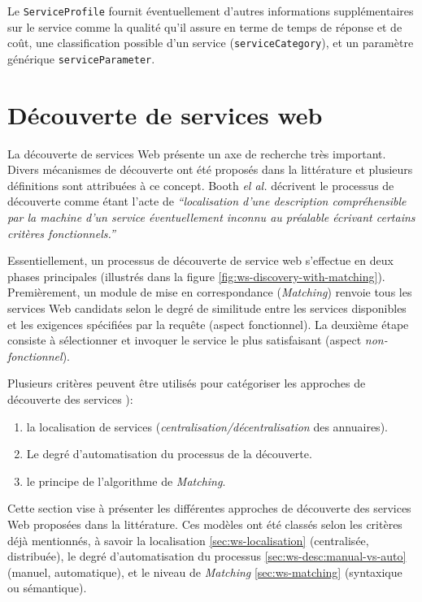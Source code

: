     Le \verb|ServiceProfile| fournit éventuellement d'autres
    informations supplémentaires sur le service comme la qualité qu'il
    assure en terme de temps de réponse et de coût, une classification
    possible d'un service (\verb|serviceCategory|), et un paramètre
    générique \verb|serviceParameter|.

\newpage
\section{Découverte de services web}
\label{sec:ws-discovery}
La découverte de services Web présente un axe de recherche très
important. Divers mécanismes de découverte ont été proposés dans la
littérature et plusieurs définitions sont attribuées à ce
concept. Booth \textit{el al.} \cite{booth2004web} décrivent le
processus de découverte comme étant l'acte de \textit{``localisation
  d'une description compréhensible par la machine d'un service
  éventuellement inconnu au préalable écrivant certains critères
  fonctionnels.''}



Essentiellement, un processus de découverte de service web s'effectue
en deux phases principales (illustrés dans la figure
\ref{fig:ws-discovery-with-matching}). Premièrement, un module de mise
en correspondance (\textit{Matching}) renvoie tous les services Web
candidats selon le degré de similitude entre les services disponibles
et les exigences spécifiées par la requête (aspect fonctionnel). La
deuxième étape consiste à sélectionner et invoquer le service le plus
satisfaisant (aspect \textit{non-fonctionnel}).

Plusieurs critères peuvent être utilisés pour catégoriser les
approches de découverte des services \cite{ mohebbi2010comparative,
  elie2010, bitar2014cbr4wsd}):

  \begin{enumerate}
  \item la localisation de services
    (\textit{centralisation/décentralisation} des annuaires).
  \item Le degré d'automatisation du processus de la découverte.
  \item le principe de l'algorithme de \textit{Matching}.
  \end{enumerate}

  Cette section vise à présenter les différentes approches de
  découverte des services Web proposées dans la littérature. Ces
  modèles ont été classés selon les critères déjà mentionnés, à
  savoir la localisation \ref{sec:ws-localisation} (centralisée,
  distribuée), le degré d'automatisation du processus
  \ref{sec:ws-desc:manual-vs-auto} (manuel, automatique), et le niveau
  de \textit{Matching} \ref{sec:ws-matching} (syntaxique ou
  sémantique).

